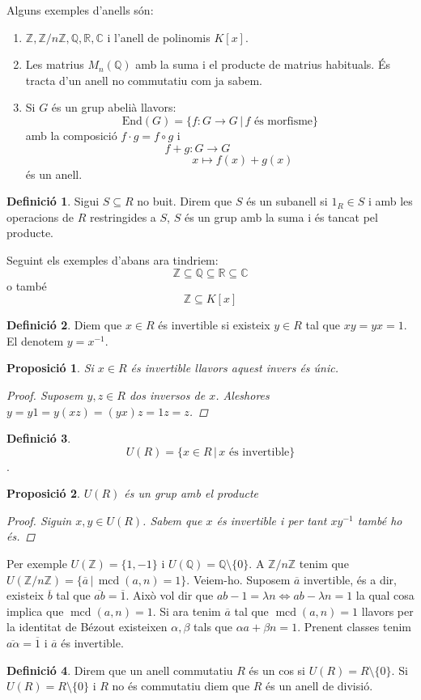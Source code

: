 \documentclass[a4paper,11pt]{report}
\newcommand{\inv}[1]{#1^{-1}}
\newcommand{\barra}{\,|\,}
\DeclareMathOperator{\mcd}{mcd}
\newcommand{\zn}{\mathbb{Z}/n\mathbb{Z}}
\renewcommand{\bar}{\overline}
\theoremstyle{theorem}
\newtheorem{proposicio}{\normalfont \sffamily\bfseries Proposició}[section]
\theoremstyle{definition}
\newtheorem{definicio}{\normalfont\sffamily\bfseries Definició}[section]
\begin{document}
Alguns exemples d'anells són:
\begin{enumerate}
	 \item $\mathbb{Z},\zn,\mathbb{Q},\mathbb{R},\mathbb{C}$ i l'anell de polinomis $K[x]$.
	 \item Les matrius $M_n(\mathbb{Q})$ amb la suma i el producte de matrius habituals. És tracta d'un anell no commutatiu com ja sabem.
	 \item Si $G$ és un grup abelià llavors:
	 $$\text{End}(G)=\{f: G\longrightarrow G\barra f\text{ és morfisme}\}$$
	 amb la composició $f\cdot g=f\circ g$ i $$f+g:G\longrightarrow G\qquad \qquad$$ $$\qquad\qquad x\longmapsto f(x)+g(x)$$ és un anell.
\end{enumerate}
\begin{definicio}
	Sigui $S\subseteq R$ no buit. Direm que $S$ és un subanell si $1_R\in S$ i amb les operacions de $R$ restringides a $S$, $S$ és un grup amb la suma i és tancat pel producte.
\end{definicio}
Seguint els exemples d'abans ara tindriem:
$$\mathbb{Z}\subseteq\mathbb{Q}\subseteq\mathbb{R}\subseteq\mathbb{C}$$ o també $$\mathbb{Z}\subseteq K[x]$$
\begin{definicio}
	Diem que $x\in R$ és invertible si existeix $y\in R$ tal que $xy=yx=1$. El denotem $y=\inv{x}$.
\end{definicio}
\begin{proposicio}
	Si $x\in R$ és invertible llavors aquest invers és únic.\begin{proof}
		Suposem $y,z\in R$ dos inversos de $x$. Aleshores $y=y1=y(xz)=(yx)z=1z=z$.
	\end{proof}
\end{proposicio}
\begin{definicio}
	$$U(R)=\{x\in R\barra x\text{ és invertible}\}$$.

\end{definicio}
\begin{proposicio}
	$U(R)$ és un grup amb el producte\begin{proof}
		Siguin $x,y\in U(R)$. Sabem que $x$ és invertible i per tant $x\inv{y}$ també ho és.
	\end{proof}
\end{proposicio}
Per exemple $U(\mathbb{Z})=\{1,-1\}$ i $U(\mathbb{Q})=\mathbb{Q}\setminus\{0\}$. A $\zn$ tenim que $U(\zn)=\{\bar{a}\barra \mcd(a,n)=1\}$. Veiem-ho.
Suposem $\bar{a}$ invertible, és a dir, existeix $\bar{b}$ tal que $\bar{ab}=\bar{1}$. Això vol dir que $ab-1=\lambda n\Leftrightarrow ab-\lambda n=1$ la qual cosa implica que $\mcd(a,n)=1$. Si ara tenim $\bar{a}$ tal que $\mcd(a,n)=1$ llavors per la identitat de Bézout existeixen $\alpha,\beta$ tals que $\alpha a+\beta n=1$. Prenent classes tenim $\bar{a\alpha}=\bar{1}$ i $\bar{a}$ és invertible.
\begin{definicio}
	Direm que un anell commutatiu $R$ és un cos si $U(R)=R\setminus\{0\}$. Si $U(R)=R\setminus\{0\}$ i $R$ no és commutatiu diem que $R$ és un anell de divisió.
\end{definicio}
\end{document}
